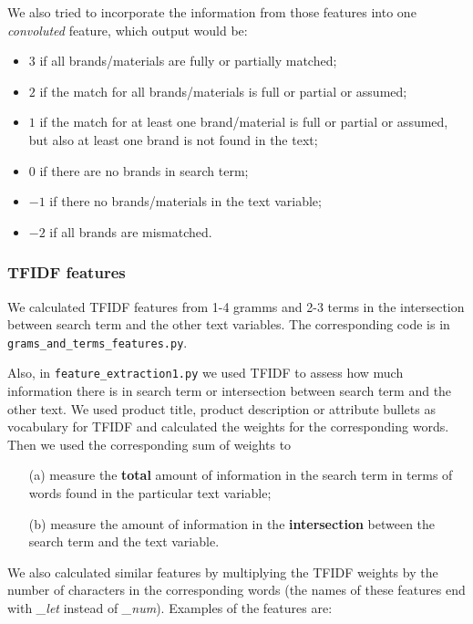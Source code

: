 \documentclass[12pt]{article}
\begin{document}
We also tried to incorporate the information from those features into one \emph{convoluted} feature, which output would be:
\begin{itemize}
\item $3$ if all brands/materials are fully or partially matched;
\item $2$ if the match for all brands/materials is full or partial or assumed;
\item $1$ if the match for at least one brand/material is full or partial or assumed, but also at least one brand is not found in the text;
\item $0$ if there are no brands in search term;
\item $-1$ if there no brands/materials in the text variable;
\item $-2$ if all brands are mismatched.
\end{itemize}

\subsubsection{TFIDF features}
\label{subsubsec:TFIDF_IandK}

We calculated TFIDF features from 1-4 gramms and 2-3 terms in the intersection between search term and the other text variables. The corresponding code is in \texttt{grams\_and\_terms\_features.py}.

Also, in \texttt{feature\_extraction1.py} we used TFIDF to assess how much information there is in search term or intersection  between search term and the other text. We used  product title, product description or attribute bullets as vocabulary for TFIDF and calculated the weights for the corresponding words. Then we used the corresponding sum of weights to
\begin{itemize}
\item[(a)] measure the \textbf{total} amount of information in the search term in terms of words found in the particular text variable;
\item[(b)] measure the amount of information in the \textbf{intersection} between the search term and the text variable.
\end{itemize}

We also calculated similar features by multiplying the TFIDF weights by the number of characters in the corresponding words (the names of these features end with \emph{\_let} instead of \emph{\_num}). Examples of the features are:
\end{document}
